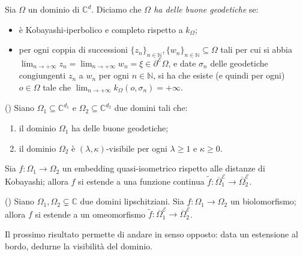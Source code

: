 \begin{defn}
    Sia $\Omega$ un dominio di $\mathbb{C}^d$. Diciamo che \textit{$\Omega$ ha delle buone geodetiche} se:
    \begin{itemize}
        \item è Kobayashi-iperbolico e completo rispetto a $k_\Omega$;
        \item per ogni coppia di successioni $\{z_n\}_{n\in\mathbb{N}},\{w_n\}_{n\in\mathbb{N}}\subseteq\Omega$ tali per cui si abbia $\displaystyle\lim_{n\longrightarrow+\infty}z_n=\displaystyle\lim_{n\longrightarrow+\infty}w_n=\xi\in\partial^\mathcal{E}\Omega$, e date $\sigma_n$ delle geodetiche congiungenti $z_n$ a $w_n$ per ogni $n\in\mathbb{N}$, si ha che esiste (e quindi per ogni) $o\in\Omega$ tale che $\displaystyle\lim_{n\longrightarrow+\infty}k_\Omega(o,\sigma_n)=+\infty$.
    \end{itemize}
\end{defn}

\begin{thm}
    (\cite[Theorem 1.6]{BZ2}) Siano $\Omega_1\subseteq\mathbb{C}^{d_1}$ e $\Omega_2\subseteq\mathbb{C}^{d_2}$ due domini tali che:
    \begin{enumerate}[label={(\arabic*)}]
        \item il dominio $\Omega_1$ ha delle buone geodetiche;
        \item il dominio $\Omega_2$ è $(\lambda,\kappa)$-visibile per ogni $\lambda\ge 1$ e $\kappa\ge 0$.
    \end{enumerate}

    Sia $f:\Omega_1\longrightarrow\Omega_2$ un embedding quasi-isometrico rispetto alle distanze di Kobayashi; allora $f$ si estende a una funzione continua $\tilde{f}:\overline{\Omega}_1^\mathcal{E}\longrightarrow\overline{\Omega}_2^\mathcal{E}$.
\end{thm}

\begin{thm} \label{citchemiserveprima}
    (\cite[Theorem 1.9]{BZ2}) Siano $\Omega_1,\Omega_2\subsetneq\mathbb{C}$ due domini lipschitziani. Sia $f:\Omega_1\longrightarrow\Omega_2$ un biolomorfismo; allora $f$ si estende a un omeomorfismo $\tilde{f}:\overline{\Omega}_1^\mathcal{E}\longrightarrow\overline{\Omega}_2^\mathcal{E}$.
\end{thm}

Il prossimo risultato permette di andare in senso opposto: data un estensione al bordo, dedurne la visibilità del dominio.

